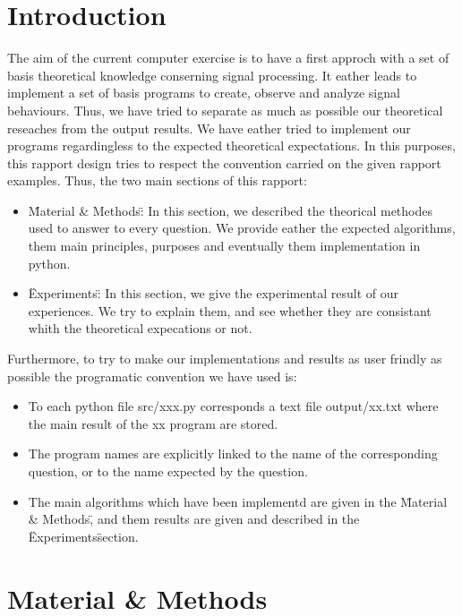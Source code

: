 \documentclass[a4paper,10pt]{article}
\begin{document}
\section{Introduction}
The aim of the current computer exercise is to have a first approch with a set of basis theoretical knowledge conserning signal processing.\newline
It eather leads to implement a set of basis programs to create, observe and analyze signal behaviours.\newline
Thus, we have tried to separate as much as possible our theoretical reseaches from the output results.  We have eather tried to implement our programs regardingless to the expected theoretical expectations.\newline
In this purposes, this rapport design tries to respect the convention carried on the given rapport examples.  Thus, the two main sections of this rapport:
  \begin{itemize}
   \item \" Material \& Methods\": In this section, we described the theorical methodes used to answer to every question.  We provide eather the expected algorithms, them main principles, purposes and eventually them implementation in python.
   \item \" Experiments\": In this section, we give the experimental result of our experiences.  We try to explain them, and see whether they are consistant whith the theoretical expecations or not.
  \end{itemize}
Furthermore, to try to make our implementations and results as user frindly as possible the programatic convention we have used is:
  \begin{itemize}
    \item To each python file src/xxx.py corresponds a text file output/xx.txt where the main result of the xx program are stored.
    \item The program names are explicitly linked to the name of the corresponding question, or to the name expected by the question.
    \item The main algorithms which have been implementd are given in the \"Material \& Methods\", and them results are given and described in the \"Experiments\" section.
  \end{itemize}

\section{Material \& Methods}
\end{document}

